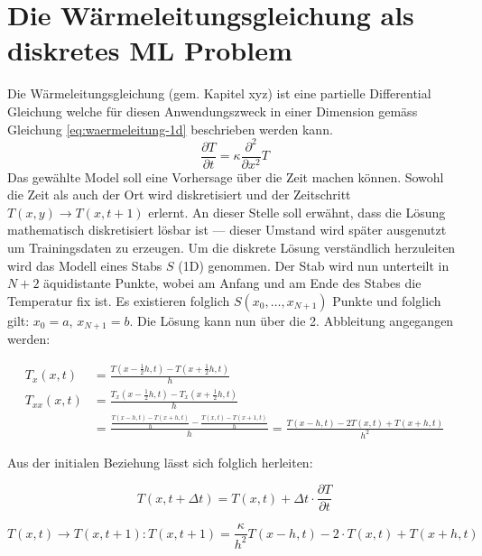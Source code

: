 \section{Die Wärmeleitungsgleichung als diskretes ML Problem}
Die Wärmeleitungsgleichung (gem. Kapitel xyz) ist eine partielle Differential Gleichung welche für diesen Anwendungszweck in einer Dimension gemäss Gleichung \ref{eq:waermeleitung-1d} beschrieben werden kann.
\begin{equation}
\frac{\partial T}{\partial t} = \kappa \frac{\partial^2}{\partial x^2} T
\label{eq:waermeleitung-1d}
\end{equation}
Das gewählte Model soll eine Vorhersage über die Zeit machen können. Sowohl die Zeit als auch der Ort wird diskretisiert und der Zeitschritt $T(x,y) \rightarrow T(x,t+1)$ erlernt. An dieser Stelle soll erwähnt, dass die Lösung mathematisch diskretisiert lösbar ist --- dieser Umstand wird später ausgenutzt um Trainingsdaten zu erzeugen. Um die diskrete Lösung verständlich herzuleiten wird das Modell eines Stabs $S$ (1D) genommen. Der Stab wird nun unterteilt in $N+2$ äquidistante Punkte, wobei am Anfang und am Ende des Stabes die Temperatur fix ist. Es existieren folglich $S(x_0, \dots, x_{N+1})$ Punkte und folglich gilt: $x_0 = a$, $x_{N+1} = b$. Die Lösung kann nun über die 2. Abbleitung angegangen werden:

\begin{align}
T_{x}(x, t)  &= \frac{T(x-\frac{1}{2}h, t) - T(x+\frac{1}{2}h, t)}{h} \\
T_{xx}(x, t) &= \frac{T_{x}(x-\frac{1}{2}h, t) - T_{x}(x+\frac{1}{2}h, t)}{h} \\
&= \frac{\frac{T(x-h, t) - T(x+h, t)}{h} - \frac{T(x, t) - T(x+1,t)}{h}}{h} = \frac{T(x-h, t) - 2 T(x, t) + T(x+h, t)}{h^{2}}
\end{align}

Aus der initialen Beziehung lässt sich folglich herleiten:

\begin{equation}
T(x,t+\Delta t) = T(x,t) + \Delta t \cdot  \frac{\partial T}{\partial t}
\end{equation}

\begin{equation}
T(x,t) \rightarrow T(x,t+1) : T(x,t+1) = \frac{\kappa}{h^{2}} T(x-h,t) - 2 \cdot T(x,t) + T(x+h,t)
\end{equation}

